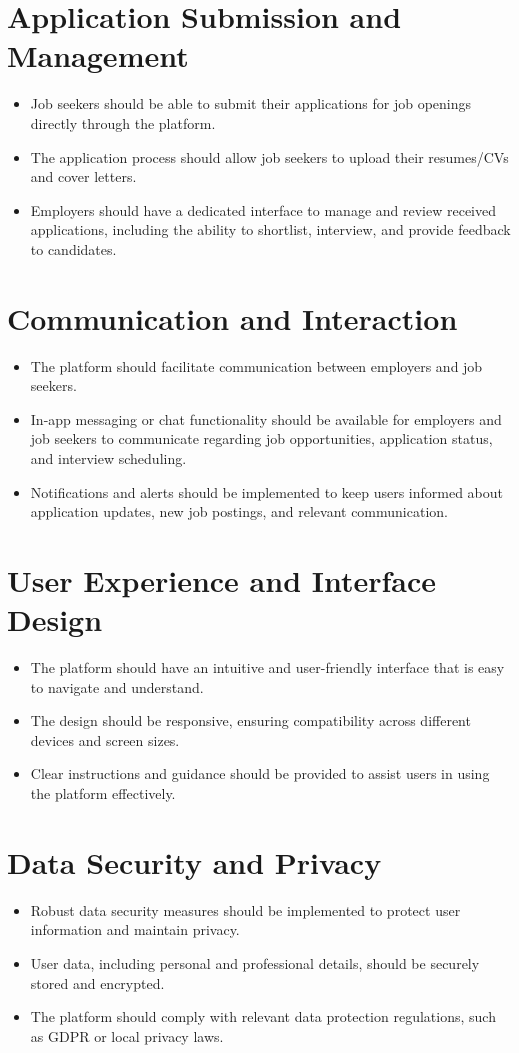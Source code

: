 \documentclass[a4paper,11pt]{report}
\begin{document}
\section{Application Submission and Management}
\begin{itemize}
  \item  Job seekers should be able to submit their applications for job openings directly through the
platform.
  \item The application process should allow job seekers to upload their resumes/CVs and cover letters.
  \item Employers should have a dedicated interface to manage and review received applications, including
the ability to shortlist, interview, and provide feedback to candidates.
\end{itemize}

\section{Communication and Interaction}
\begin{itemize}
  \item The platform should facilitate communication between employers and job seekers.
  \item In-app messaging or chat functionality should be available for employers and job seekers to
communicate regarding job opportunities, application status, and interview scheduling.
\item Notifications and alerts should be implemented to keep users informed about application updates,
new job postings, and relevant communication.
\end{itemize}

\section{User Experience and Interface Design}
\begin{itemize}
  \item The platform should have an intuitive and user-friendly interface that is easy to navigate and
understand.
\item The design should be responsive, ensuring compatibility across different devices and screen sizes.
\item Clear instructions and guidance should be provided to assist users in using the platform effectively.
\end{itemize}
\section{Data Security and Privacy}
\begin{itemize}
\item Robust data security measures should be implemented to protect user information and maintain
privacy.
\item  User data, including personal and professional details, should be securely stored and encrypted.
\item The platform should comply with relevant data protection regulations, such as GDPR or local privacy
laws.
\end{itemize}
\end{document}
